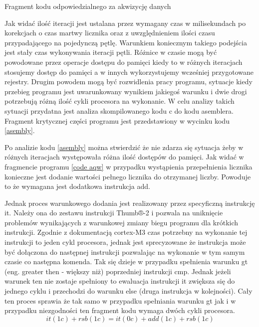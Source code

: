 \begin{kod}
        
        \caption{Fragment kodu odpowiedzialnego za akwizycję danych}
        \label{code aqw}
\end{kod}

Jak widać ilość iteracji jest ustalana przez wymagany czas w milisekundach po korekcjach o czas martwy licznika oraz z uwzględnieniem ilości czasu przypadającego na pojedynczą pętlę. 
Warunkiem koniecznym takiego podejścia jest stały czas wykonywania iteracji pętli. 
Różnice w czasie mogą być powodowane przez operacje dostępu do pamięci kiedy to w różnych iteracjach stosujemy dostęp do pamięci a w innych wykorzystujemy wcześniej przygotowane rejestry.
Drugim powodem mogą być rozwidlenia pracy programu, sytuacje kiedy przebieg programu jest uwarunkowany wynikiem jakiegoś warunku i dwie drogi potrzebują różną ilość cykli procesora na wykonanie. 
W celu analizy takich sytuacji przydatna jest analiza skompilowanego kodu c do kodu asemblera.
Fragment krytycznej części programu jest przedstawiony w wycinku kodu \ref{asembly}.

\begin{kod}
        Assembler},firstline=30, lastline=48]{code_source/asembler/loop_final.S}
        \caption{Fragment kodu asemblera utworzonego przez kompilację części kodu \ref{code aqw}. }
        \label{asembly}
\end{kod}

Po analizie kodu \ref{asembly} można stwierdzić że nie zdarza się sytuacja żeby w różnych iteracjach występowała różna ilość dostępów do pamięci.
Jak widać w fragmencie programu \ref{code aqw} w przypadku wystąpienia przepełnienia licznika konieczne jest dodanie wartości pełnego licznika do otrzymanej liczby. 
Powoduje to że wymagana jest dodatkowa instrukcja add.

Jednak proces warunkowego dodania jest realizowany przez specyficzną instrukcję it.
Należy ona do zestawu instrukcji Thumb®-2 i pozwala na uniknięcie problemów wynikających z warunkowej zmiany biegu programu dla krótkich instrukcji. 
Zgodnie z dokumentacją\cite{cycles} cortex-M3 czas potrzebny na wykonanie tej instrukcji to jeden cykl procesora, jednak jest sprecyzowane że instrukcja może być dołączona do następnej instrukcji pozwalając na wykonanie w tym samym czasie co następna komenda.
Tak się dzieje w przypadku spełnienia warunku gt (eng. greater then - większy niż) poprzedniej instrukcji cmp. Jednak jeżeli warunek ten nie zostaje spełniony to ewaluacja instrukcji it zwiększa się do jednego cyklu i przechodzi do warunku else (druga instrukcja w kolejności).
Cały ten proces sprawia że tak samo w przypadku spełniania warunku gt jak i w przypadku niezgodności ten fragment kodu wymaga dwóch cykli procesora.
$$it(1c) + rsb(1c) = it(0c) + add(1c) + rsb(1c)$$

